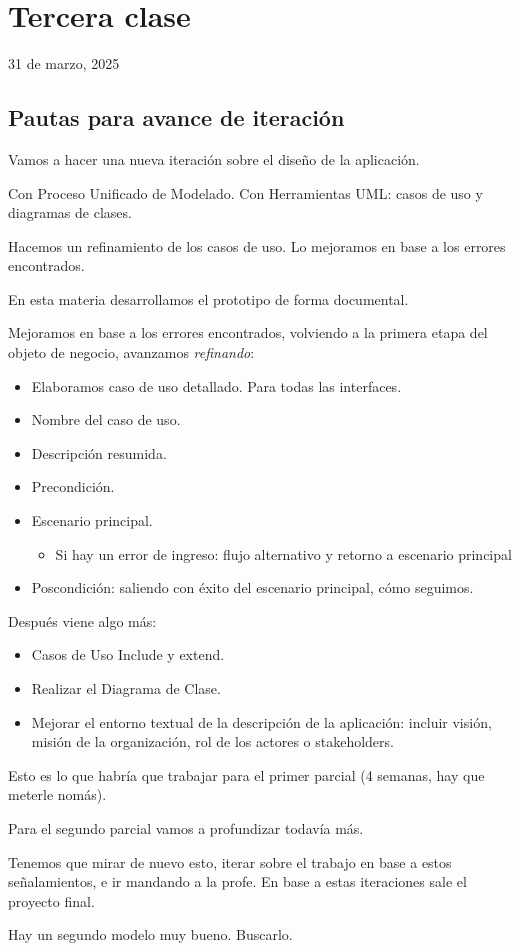 \section{Tercera clase}

31 de marzo, 2025

\subsection{Pautas para avance de iteración}

Vamos a hacer una nueva iteración sobre el diseño de la aplicación.

Con Proceso Unificado de Modelado.
Con Herramientas UML: casos de uso y diagramas de clases.

Hacemos un refinamiento de los casos de uso.
Lo mejoramos en base a los errores encontrados.

En esta materia desarrollamos el prototipo de forma documental.

Mejoramos en base a los errores encontrados,
volviendo a la primera etapa del objeto de negocio,
avanzamos \textit{refinando}:
\begin{itemize}
    \item Elaboramos caso de uso detallado. Para todas las interfaces.
    \item Nombre del caso de uso.
    \item Descripción resumida.
    \item Precondición.
    \item Escenario principal.
    \begin{itemize}
        \item Si hay un error de ingreso: flujo alternativo y retorno a escenario principal
    \end{itemize}
    \item Poscondición: saliendo con éxito del escenario principal, cómo seguimos.
\end{itemize}

Después viene algo más:
\begin{itemize}
    \item Casos de Uso Include y extend.
    \item Realizar el Diagrama de Clase.
    \item Mejorar el entorno textual de la descripción de la aplicación: incluir visión, misión de la organización, rol de los actores o stakeholders.
\end{itemize}

Esto es lo que habría que trabajar para el primer parcial (4 semanas, hay que meterle nomás).

Para el segundo parcial vamos a profundizar todavía más.

Tenemos que mirar de nuevo esto,
iterar sobre el trabajo en base a estos señalamientos,
e ir mandando a la profe.
En base a estas iteraciones sale el proyecto final.

Hay un segundo modelo muy bueno. Buscarlo.